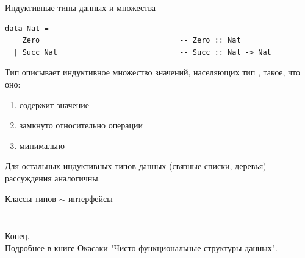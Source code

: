 \documentclass[aspectratio=169
  , xcolor={svgnames}
  , hyperref=
      { colorlinks
      , urlcolor=DarkBlue 
      }  
  , russian  %
  ]{beamer}
\theoremstyle{exerciseStyle1}
\begin{document}
\begin{frame}[fragile]{Индуктивные типы данных и множества}
\begin{verbatim}
data Nat = 
    Zero                                -- Zero :: Nat
  | Succ Nat                            -- Succ :: Nat -> Nat
\end{verbatim}
Тип  описывает индуктивное множество значений, населяющих тип , такое, что оно:
\begin{enumerate}
  \item содержит значение 
  \item замкнуто относительно операции 
  \item минимально
\end{enumerate}

Для остальных индуктивных типов данных (связные списки, деревья) рассуждения аналогичны.
\end{frame}

\begin{frame}[fragile]{Классы типов $\sim$ интерфейсы}
\begin{minipage}{.48\textwidth}
  \inputminted[firstline=9,lastline=15]{haskell}{code/Stacks.hs}
\end{minipage}
\begin{minipage}{.48\textwidth}
  \inputminted[firstline=16,lastline=26]{haskell}{code/Stacks.hs}
\end{minipage}
\end{frame}





%


\begin{frame}
\begin{center}
  {\Huge Конец.}\\
  
  Подробнее в книге Окасаки "Чисто функциональные структуры данных".
\end{center}
\end{frame}


\end{document}
